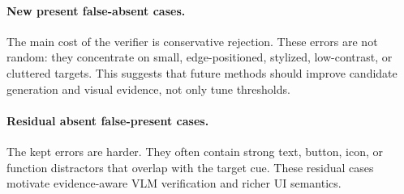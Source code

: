 \paragraph{New present false-absent cases.}
The main cost of the verifier is conservative rejection. These errors are not random: they concentrate on small, edge-positioned, stylized, low-contrast, or cluttered targets. This suggests that future methods should improve candidate generation and visual evidence, not only tune thresholds.

\paragraph{Residual absent false-present cases.}
The kept errors are harder. They often contain strong text, button, icon, or function distractors that overlap with the target cue. These residual cases motivate evidence-aware VLM verification and richer UI semantics.
